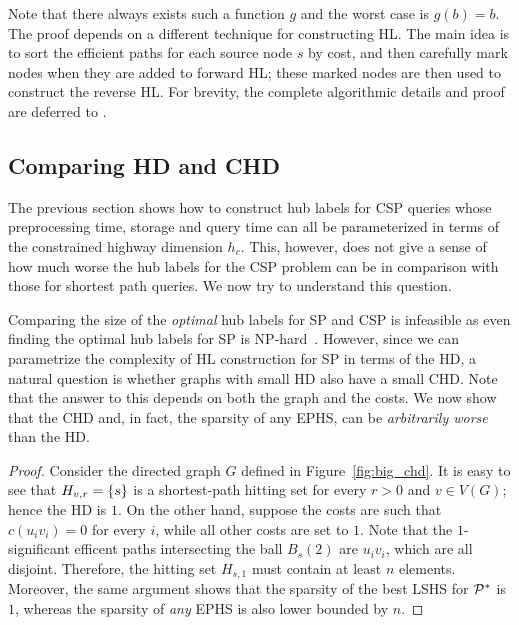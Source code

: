 Note that there always exists such a function $g$ and the worst case is $g(b)=b$.
The proof depends on a different technique for constructing HL.
The main idea is to sort the efficient paths for each source node $s$ by cost, and then carefully mark nodes when they are added to forward HL; these marked nodes are then used to construct the reverse HL.
For brevity, the complete algorithmic details and proof are deferred to \cite{TechReport}.

\subsection{Comparing HD and CHD}
\label{ssec:hdvschd}

The previous section shows how to construct hub labels for CSP queries whose preprocessing time, storage and query time can all be parameterized in terms of the constrained highway dimension $h_c$. 
This, however, does not give a sense of how much worse the hub labels for the CSP problem can be in comparison with those for shortest path queries. 
We now try to understand this question.


Comparing the size of the \emph{optimal} hub labels for SP and CSP is infeasible as even finding the optimal hub labels for SP is NP-hard~\cite{babenko_hl_complexity}. 
However, since we can parametrize the complexity of HL construction for SP in terms of the HD, a natural question is whether graphs with small HD also have a small CHD. 
Note that the answer to this depends on both the graph and the costs.
We now show that the CHD and, in fact, the sparsity of any EPHS, can be \emph{arbitrarily worse} than the HD. 

\begin{proof}
	Consider the directed graph $G$ defined in Figure~\ref{fig:big_chd}.
	It is easy to see that $H_{v,r}=\{s\}$ is a shortest-path hitting set for every $r>0$ and $v\in V(G)$; hence the HD is $1$.
	On the other hand, suppose the costs are such that $c(u_iv_i)=0$ for every $i$, while all other costs are set to $1$.
	Note that the $1$-significant efficent paths intersecting the ball $B_s(2)$ are $u_iv_i$, which are all disjoint.
	Therefore, the hitting set $H_{s,1}$ must contain at least $n$ elements. Moreover, the same argument shows that the sparsity of the best LSHS for $\mathcal{P}^*$ is $1$, whereas the sparsity of \emph{any} EPHS is also lower bounded by $n$.
\end{proof}

